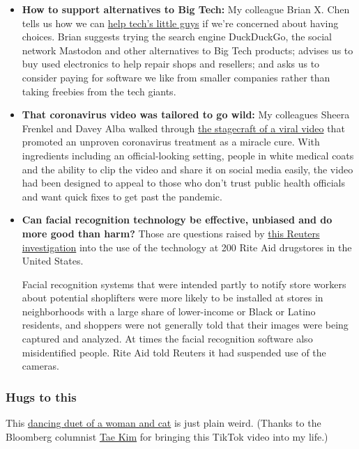 \begin{itemize}
\item
  \textbf{How to support alternatives to Big Tech:} My colleague Brian
  X. Chen tells us how we can
  \href{https://www.nytimes.com/2020/07/29/technology/personaltech/big-tech-power-how-to-fight.html}{help
  tech's little guys} if we're concerned about having choices. Brian
  suggests trying the search engine DuckDuckGo, the social network
  Mastodon and other alternatives to Big Tech products; advises us to
  buy used electronics to help repair shops and resellers; and asks us
  to consider paying for software we like from smaller companies rather
  than taking freebies from the tech giants.
\item
  \textbf{That coronavirus video was tailored to go wild:} My colleagues
  Sheera Frenkel and Davey Alba walked through
  \href{https://www.nytimes.com/2020/07/28/technology/virus-video-trump.html}{the
  stagecraft of a viral video} that promoted an unproven coronavirus
  treatment as a miracle cure. With ingredients including an
  official-looking setting, people in white medical coats and the
  ability to clip the video and share it on social media easily, the
  video had been designed to appeal to those who don't trust public
  health officials and want quick fixes to get past the pandemic.
\item
  \textbf{Can facial recognition technology be effective, unbiased and
  do more good than harm?} Those are questions raised by
  \href{https://www.reuters.com/investigates/special-report/usa-riteaid-software/}{this
  Reuters investigation} into the use of the technology at 200 Rite Aid
  drugstores in the United States.

  Facial recognition systems that were intended partly to notify store
  workers about potential shoplifters were more likely to be installed
  at stores in neighborhoods with a large share of lower-income or Black
  or Latino residents, and shoppers were not generally told that their
  images were being captured and analyzed. At times the facial
  recognition software also misidentified people. Rite Aid told Reuters
  it had suspended use of the cameras.
\end{itemize}

\hypertarget{hugs-to-this}{%
\subsubsection{Hugs to this}\label{hugs-to-this}}

This
\href{https://www.tiktok.com/@bizqueen/video/6852740756692569349}{dancing
duet of a woman and cat} is just plain weird. (Thanks to the Bloomberg
columnist \href{https://twitter.com/firstadopter}{Tae Kim} for bringing
this TikTok video into my life.)


